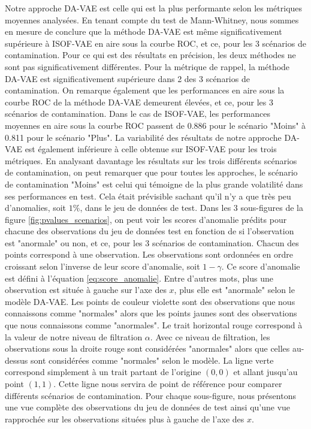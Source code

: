 Notre approche DA-VAE est celle qui est la plus performante selon les métriques moyennes analysées. En tenant compte du test de Mann-Whitney, nous sommes en mesure de conclure que la méthode DA-VAE est même significativement supérieure à ISOF-VAE en aire sous la courbe ROC, et ce, pour les 3 scénarios de contamination. Pour ce qui est des résultats en précision, les deux méthodes ne sont pas significativement différentes. Pour la métrique de rappel, la méthode DA-VAE est significativement supérieure dans 2 des 3 scénarios de contamination. On remarque également  que les performances en aire sous la courbe ROC de la méthode DA-VAE demeurent élevées, et ce, pour les 3 scénarios de contamination. Dans le cas de ISOF-VAE, les performances moyennes en aire sous la courbe ROC passent de 0.886 pour le scénario "Moins" à 0.811 pour le scénario "Plus". La variabilité des résultats de notre approche DA-VAE est également inférieure à celle obtenue sur ISOF-VAE pour les trois métriques. En analysant davantage les résultats sur les trois différents scénarios de contamination, on peut remarquer que pour toutes les approches, le scénario de contamination "Moins" est celui qui témoigne de la plus grande volatilité dans ses performances en test. Cela était prévisible sachant qu'il n'y a que très peu d'anomalies, soit $1\%$, dans le jeu de données de test. Dans les 3 sous-figures de la figure \ref{fig:pvalues_scenarios}, on peut voir les scores d'anomalie prédits pour chacune des observations du jeu de données test en fonction de si l'observation est "anormale" ou non, et ce, pour les 3 scénarios de contamination. Chacun des points correspond à une observation. Les observations sont ordonnées en ordre croissant selon l'inverse de leur score d'anomalie, soit $1-\gamma$. Ce score d'anomalie est défini à l'équation \ref{eq:score_anomalie}. Entre d'autres mots, plus une observation est située à gauche sur l'axe des $x$, plus elle est "anormale" selon le modèle DA-VAE. Les points de couleur violette sont des observations que nous connaissons comme "normales" alors que les points jaunes sont des observations que nous connaissons comme "anormales". Le trait horizontal rouge correspond à la valeur de notre niveau de filtration $\alpha$. Avec ce niveau de filtration, les observations sous la droite rouge sont considérées "anormales" alors que celles au-dessus sont considérées comme "normales" selon le modèle. La ligne verte correspond simplement à un trait partant de l'origine $(0,0)$ et allant jusqu'au point $(1,1)$. Cette ligne nous servira de point de référence pour comparer différents scénarios de contamination. Pour chaque sous-figure, nous présentons une vue complète des observations du jeu de données de test ainsi qu'une vue rapprochée sur les observations situées plus à gauche de l'axe des $x$.

